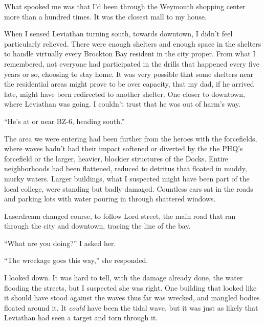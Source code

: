 What spooked me was that I'd been through the Weymouth shopping center more than a hundred times.  It was the closest mall to my house.



When I sensed Leviathan turning south, towards downtown, I didn't feel particularly relieved.  There were enough shelters and enough space in the shelters to handle virtually every Brockton Bay resident in the city proper.  From what I remembered, not everyone had participated in the drills that happened every five years or so, choosing to stay home.  It was very possible that some shelters near the residential areas might prove to be over capacity, that my dad, if he arrived late, might have been redirected to another shelter.  One closer to downtown, where Leviathan was going.  I couldn't trust that he was out of harm's way.



``He's at or near BZ-6, heading south.''



The area we were entering had been further from the heroes with the forcefields, where waves hadn't had their impact softened or diverted by the the PHQ's forcefield or the larger, heavier, blockier structures of the Docks.  Entire neighborhoods had been flattened, reduced to detritus that floated in muddy, murky waters.  Larger buildings, what I suspected might have been part of the local college, were standing but badly damaged. Countless cars sat in the roads and parking lots with water pouring in through shattered windows.



Laserdream changed course, to follow Lord street, the main road that ran through the city and downtown, tracing the line of the bay.



``What are you doing?'' I asked her.



``The wreckage goes this way,'' she responded.



I looked down.  It was hard to tell, with the damage already done, the water flooding the streets, but I suspected she was right.  One building that looked like it should have stood against the waves thus far was wrecked, and mangled bodies floated around it.  It \emph{could} have been the tidal wave, but it was just as likely that Leviathan had seen a target and torn through it.



